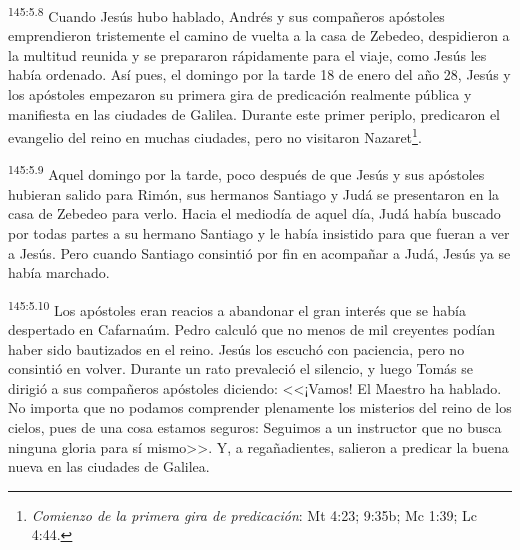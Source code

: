 \par 
\textsuperscript{145:5.8} Cuando Jesús hubo hablado, Andrés y sus compañeros apóstoles emprendieron tristemente el camino de vuelta a la casa de Zebedeo, despidieron a la multitud reunida y se prepararon rápidamente para el viaje, como Jesús les había ordenado. Así pues, el domingo por la tarde 18 de enero del año 28, Jesús y los apóstoles empezaron su primera gira de predicación realmente pública y manifiesta en las ciudades de Galilea. Durante este primer periplo, predicaron el evangelio del reino en muchas ciudades, pero no visitaron Nazaret\footnote{\textit{Comienzo de la primera gira de predicación}: Mt 4:23; 9:35b; Mc 1:39; Lc 4:44.}.

\par 
\textsuperscript{145:5.9} Aquel domingo por la tarde, poco después de que Jesús y sus apóstoles hubieran salido para Rimón, sus hermanos Santiago y Judá se presentaron en la casa de Zebedeo para verlo. Hacia el mediodía de aquel día, Judá había buscado por todas partes a su hermano Santiago y le había insistido para que fueran a ver a Jesús. Pero cuando Santiago consintió por fin en acompañar a Judá, Jesús ya se había marchado.

\par 
\textsuperscript{145:5.10} Los apóstoles eran reacios a abandonar el gran interés que se había despertado en Cafarnaúm. Pedro calculó que no menos de mil creyentes podían haber sido bautizados en el reino. Jesús los escuchó con paciencia, pero no consintió en volver. Durante un rato prevaleció el silencio, y luego Tomás se dirigió a sus compañeros apóstoles diciendo: <<¡Vamos! El Maestro ha hablado. No importa que no podamos comprender plenamente los misterios del reino de los cielos, pues de una cosa estamos seguros: Seguimos a un instructor que no busca ninguna gloria para sí mismo>>. Y, a regañadientes, salieron a predicar la buena nueva en las ciudades de Galilea.